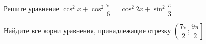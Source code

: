 \begin{ex}
	\begin{condition}
		\begin{enumcols}[label=\asbuk*)]
			\item Решите уравнение \( \cos^2 x + \cos^2 {\dfrac{\pi}{6}} = \cos^2 2x + \sin^2{\dfrac{\pi}{3}} \)
			\item Найдите все корни уравнения, принадлежащие отрезку \( \left(\dfrac{7\pi}{2};\dfrac{9\pi}{2}\right] \)
		\end{enumcols}
	\end{condition}
\end{ex}